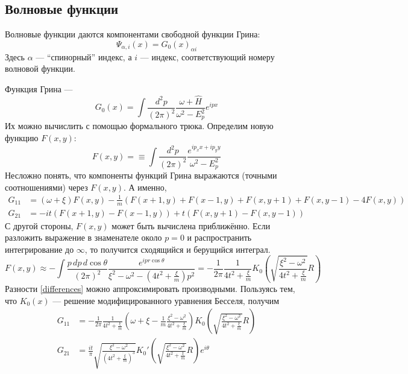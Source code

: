 \subsection{Волновые функции}
Волновые функции даются компонентами свободной
функции Грина:
\begin{equation}
    \Psi_{\alpha, i}(x) = G_0(x)_{\alpha i}
\end{equation}
Здесь $\alpha$ --- ``спинорный'' индекс, а $i$ --- индекс, соответствующий номеру волновой 
функции.

Функция Грина --- 
\begin{equation}
    G_0(x) = \int \frac{d^2 p}{(2\pi)^2} 
            \frac{\omega + \hat{H}}{\omega^2 - E_p^2} e^{ipx}
\end{equation}
Их можно вычислить с помощью формального трюка. Определим новую функцию
$F(x,y)$:
\begin{equation}
    F(x,y) = \equiv \int \frac{d^2 p}{(2\pi)^2} 
            \frac{e^{ip_x x + ip_y y}}{\omega^2 - E_p^2} 
\end{equation}
Несложно понять, что компоненты функций Грина выражаются (точными соотношениями)
 через $F(x,y)$. А именно,
\begin{equation}
    \label{differences}
    \begin{split}
        G_{11} & = (\omega + \xi) F(x,y) - 
            \frac{1}{m}(F(x+1,y) + F(x-1,y) + F(x,y+1) + F(x, y-1) - 4F(x,y))\\
        G_{21} & = -it(F(x+1,y) - F(x-1,y)) + t(F(x,y+1) - F(x,y-1))
    \end{split}
\end{equation}
С другой стороны, $F(x,y)$ может быть вычислена приближённо. Если разложить 
выражение в знаменателе около $p = 0$ и распространить интегрирование до $\infty$, то получится
сходящийся и берущийся интеграл.
\begin{equation}
    F(x,y) \approx -\int \frac{p\,dp\,d\cos{\theta}}{(2\pi)^2} 
        \frac{e^{ipr\cos{\theta}}}{\xi^2 - \omega^2 - (4t^2 + \frac{\xi}{m})p^2} = 
        -\frac{1}{2\pi} \frac{1}{4t^2 + \frac{\xi}{m}}
        K_0 \left(\sqrt{\frac{\xi^2 - \omega^2}{4t^2 + \frac{\xi}{m}}}R \right)
\end{equation}
Разности \eqref{differences} можно аппроксимировать производными. Пользуясь тем, что
$K_0(x)$ --- решение модифицированного уравнения Бесселя, получим 
\begin{equation}
    \begin{split}
        G_{11} & = -\frac{1}{2\pi} \frac{1}{4t^2 + \frac{\xi}{m}}
        \left( \omega + \xi - \frac{1}{m} \frac{\xi^2 - \omega^2}{4t^2 + \frac{\xi}{m}} \right)
        K_0 \left(\sqrt{\frac{\xi^2 - \omega^2}{4t^2 + \frac{\xi}{m}}}R \right)\\
        G_{21} & = \frac{it}{\pi} \sqrt{\frac{\xi^2 - \omega^2}
                                     {(4t^2 + \frac{\xi}{m})^{3}}}
        K_0' \left(\sqrt{\frac{\xi^2 - \omega^2}{4t^2 + \frac{\xi}{m}}}R \right)e^{i\theta}
    \end{split}
\end{equation}

